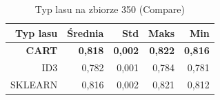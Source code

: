 \begin{table}[htbp]
\centering
\small
\setlength{\tabcolsep}{6pt}
\renewcommand{\arraystretch}{1.2}
\caption{Typ lasu na zbiorze 350 (Compare)}
\label{tab:Compare_on_350}
\begin{tabular}{r|r|r|r|r}
\toprule
Typ lasu & Średnia & Std & Maks & Min \\
\hline
\textbf{CART} & \textbf{0,818} & \textbf{0,002} & \textbf{0,822} & \textbf{0,816} \\
ID3 & 0,782 & 0,001 & 0,784 & 0,781 \\
SKLEARN & 0,816 & 0,002 & 0,821 & 0,812 \\
\bottomrule
\end{tabular}
\end{table}